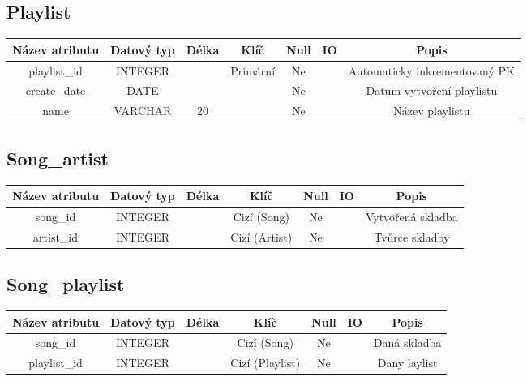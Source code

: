 \subsection*{Playlist}
\begin{tabular}{ |c|c c c c c|c| }
    \hline
    \textbf{Název atributu} & \textbf{Datový typ} & \textbf{Délka} & \textbf{Klíč} & \textbf{Null} & \textbf{IO} & \textbf{Popis}                         \\
    \hline
    playlist\_id            & INTEGER             &                & Primární      & Ne            &             & Automaticky inkrementovaný PK \\
    create\_date            & DATE                &                &               & Ne            &             & Datum vytvoření playlistu     \\
    name                    & VARCHAR             & 20             &               & Ne            &             & Název playlistu               \\
    \hline
\end{tabular}
\bigskip

\subsection*{Song\_artist}
\begin{tabular}{ |c|c c c c c|c| }
    \hline
    \textbf{Název atributu} & \textbf{Datový typ} & \textbf{Délka} & \textbf{Klíč} & \textbf{Null} & \textbf{IO} & \textbf{Popis}                         \\
    \hline
    song\_id                & INTEGER             &                & Cizí (Song)   & Ne            &             & Vytvořená skladba \\
    artist\_id              & INTEGER             &                & Cizí (Artist) & Ne            &             & Tvůrce skladby    \\
    \hline
\end{tabular}
\bigskip

\subsection*{Song\_playlist}
\begin{tabular}{ |c|c c c c c|c| }
    \hline
    \textbf{Název atributu} & \textbf{Datový typ} & \textbf{Délka} & \textbf{Klíč}   & \textbf{Null} & \textbf{IO} & \textbf{Popis}                         \\
    \hline
    song\_id                & INTEGER             &                & Cizí (Song)     & Ne            &             & Daná skladba   \\
    playlist\_id            & INTEGER             &                & Cizí (Playlist) & Ne            &             & Dany laylist   \\
    \hline
\end{tabular}
\bigskip

